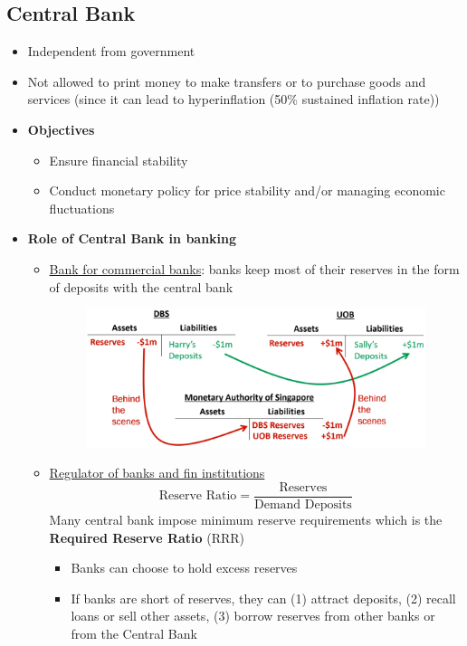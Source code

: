 \documentclass{article}
\begin{document}
\begin{multicols}{2}
\subsection{Central Bank}
\begin{itemize}
	\item Independent from government
	\item Not allowed to print money to make transfers or to purchase goods and services (since it can lead to hyperinflation (50\% sustained inflation rate))
	\item \textbf{Objectives}
	\begin{itemize}
		\item Ensure financial stability
		\item Conduct monetary policy for price stability and/or managing economic fluctuations
	\end{itemize}
	\item \textbf{Role of Central Bank in banking}
	\begin{itemize}
		\item \underline{Bank for commercial banks}: banks keep most of their reserves in the form of deposits with the central bank
		\begin{figure}[H]
			\centering
			\includegraphics[width=\columnwidth]{images/centralbank.png}
		\end{figure}
		\item \underline{Regulator of banks and fin institutions}
		$$\text{Reserve Ratio} = \frac{\text{Reserves}}{\text{Demand Deposits}}$$
		Many central bank impose minimum reserve requirements which is the \textbf{Required Reserve Ratio} (RRR)
		\begin{itemize}
			\item Banks can choose to hold excess reserves
			\item If banks are short of reserves, they can (1) attract deposits, (2) recall loans or sell other assets, (3) borrow reserves from other banks or from the Central Bank
		\end{itemize}
	\end{itemize}


\end{itemize}
\end{multicols}
\end{document}
